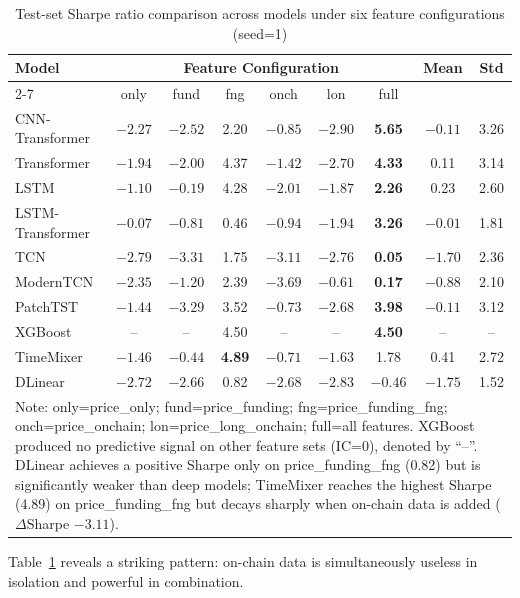 \documentclass[a4paper]{cas-dc}
\begin{document}
\begin{table}[t]
\centering
\footnotesize
\setlength{\tabcolsep}{2.5pt}
\caption{Test-set Sharpe ratio comparison across models under six feature configurations (seed=1)}
\label{tab:feature_ablation}
\begin{tabular}{lcccccccc}
\toprule
\multirow{2}{*}{Model} & \multicolumn{6}{c}{Feature Configuration} & \multirow{2}{*}{Mean} & \multirow{2}{*}{Std} \\
\cmidrule(lr){2-7}
& only & fund & fng & onch & lon & full \\
\midrule
CNN-Transformer & $-2.27$ & $-2.52$ & 2.20 & $-0.85$ & $-2.90$ & \textbf{5.65} & $-0.11$ & 3.26 \\
Transformer & $-1.94$ & $-2.00$ & 4.37 & $-1.42$ & $-2.70$ & \textbf{4.33} & 0.11 & 3.14 \\
LSTM & $-1.10$ & $-0.19$ & 4.28 & $-2.01$ & $-1.87$ & \textbf{2.26} & 0.23 & 2.60 \\
LSTM-Transformer & $-0.07$ & $-0.81$ & 0.46 & $-0.94$ & $-1.94$ & \textbf{3.26} & $-0.01$ & 1.81 \\
TCN & $-2.79$ & $-3.31$ & 1.75 & $-3.11$ & $-2.76$ & \textbf{0.05} & $-1.70$ & 2.36 \\
ModernTCN & $-2.35$ & $-1.20$ & 2.39 & $-3.69$ & $-0.61$ & \textbf{0.17} & $-0.88$ & 2.10 \\
PatchTST & $-1.44$ & $-3.29$ & 3.52 & $-0.73$ & $-2.68$ & \textbf{3.98} & $-0.11$ & 3.12 \\
XGBoost & -- & -- & 4.50 & -- & -- & \textbf{4.50} & -- & -- \\
TimeMixer & $-1.46$ & $-0.44$ & \textbf{4.89} & $-0.71$ & $-1.63$ & 1.78 & 0.41 & 2.72 \\
DLinear & $-2.72$ & $-2.66$ & 0.82 & $-2.68$ & $-2.83$ & $-0.46$ & $-1.75$ & 1.52 \\
\bottomrule
\multicolumn{9}{p{0.9\textwidth}}{\footnotesize Note: only=price\_only; fund=price\_funding; fng=price\_funding\_fng; onch=price\_onchain; lon=price\_long\_onchain; full=all features. XGBoost produced no predictive signal on other feature sets (IC=0), denoted by ``--''. DLinear achieves a positive Sharpe only on price\_funding\_fng (0.82) but is significantly weaker than deep models; TimeMixer reaches the highest Sharpe (4.89) on price\_funding\_fng but decays sharply when on-chain data is added ($\Delta$Sharpe $-3.11$).}
\end{tabular}
\end{table}

Table~\ref{tab:feature_ablation} reveals a striking pattern: on-chain data is simultaneously useless in isolation and powerful in combination.
\end{document}
